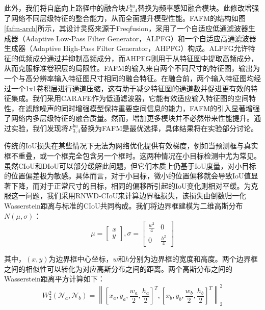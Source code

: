 此外，我们将自底向上路径中的融合块$F_{3, 4}^{bu}$替换为频率感知融合模块。此修改增强了网络不同层级特征的整合能力，从而全面提升模型性能。FAFM的结构如图\ref{fafm-arch}所示，其设计灵感来源于Freqfusion\cite{Chen2024FreqFus}，采用了一个自适应低通滤波器生成器（Adaptive Low-Pass Filter Generator，ALPFG）和一个自适应高通滤波器生成器（Adaptive High-Pass Filter Generator，AHPFG）构成。ALPFG允许特征的低频成分通过并抑制高频成分，而AHPFG则用于从特征图中提取高频成分，从而克服标准卷积层的局限性。FAFM的输入来自两个不同尺寸的特征图，输出为一个与高分辨率输入特征图尺寸相同的融合特征。在融合前，两个输入特征图均经过一个1x1卷积层进行通道压缩，这有助于减少特征图的通道数并促进更有效的特征集成。我们采用CARAFE\cite{Wang2019CARAFE}作为低通滤波器，它能有效适应输入特征图的空间特性，在滤除噪声的同时增强模型保持重要空间信息的能力，FAFM的引入显著增强了网络内多层级特征的融合质量。然而，增加更多模块并不必然带来性能提升。通过实验，我们发现将$F_{3, 4}^{bu}$替换为FAFM是最优选择，具体结果将在实验部分讨论。

传统的IoU损失在某些情况下无法为网络优化提供有效梯度，例如当预测框与真实框不重叠，或一个框完全包含另一个框时。这两种情况在小目标检测中尤为常见。虽然CIoU和DIoU可以部分缓解此问题，但它们本质上仍基于IoU度量，对小目标的位置偏差极为敏感。具体而言，对于小目标，微小的位置偏移就会导致IoU值显著下降，而对于正常尺寸的目标，相同的偏移所引起的IoU变化则相对平缓。为克服这一问题，我们采用RNWD-CIoU来计算边界框损失，该损失由倒数归一化Wasserstein距离\cite{Wang2021NGWD}与标准的CIoU共同构成。我们将边界框建模为二维高斯分布$N(\mu,\sigma)$：
\begin{equation}
    \mu = \begin{bmatrix} x \\ y \end{bmatrix}, \sigma = \begin{bmatrix} \frac{w^2}{4} & 0 \\ 0 & \frac{h^2}{4} \end{bmatrix}
\end{equation}

其中，$(x,y)$为边界框中心坐标，$w$和$h$分别为边界框的宽度和高度。两个边界框之间的相似性可以转化为对应高斯分布之间的距离。两个高斯分布之间的Wasserstein距离平方计算如下：
\begin{equation}
    W_{2}^{2}(\mathcal{N}_{a}, \mathcal{N}_{b}) = \left\| \left[x_a, y_a, \frac{w_a}{2}, \frac{h_a}{2}\right]^T, \left[x_b, y_b, \frac{w_b}{2}, \frac{h_b}{2}\right]^T \right\|_{2}^{2}
\end{equation}

